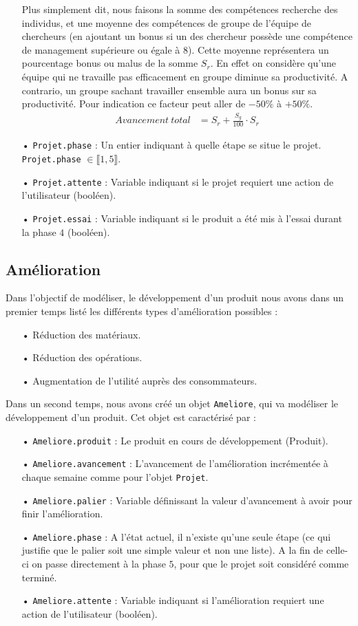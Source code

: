 \begin{enumerate}
	Plus simplement dit, nous faisons la somme des compétences recherche des individus, et une moyenne des compétences de groupe de l'équipe de chercheurs (en ajoutant un bonus si un des chercheur possède une compétence de management supérieure ou égale à $8$). Cette moyenne représentera un pourcentage bonus ou malus de la somme $S_{r}$. En effet on considère qu'une équipe qui ne travaille pas efficacement en groupe diminue sa productivité. A contrario, un groupe sachant travailler ensemble aura un bonus sur sa productivité. Pour indication ce facteur peut aller de $-50\%$ à $+50\%$. 
	\begin{align*}
	Avancement\ total &= S_{r}+\frac{S_{g}}{100}\cdot S_{r}
	\end{align*}
	
	\item[•] \texttt{Projet.phase} : Un entier indiquant à quelle étape se situe le projet. \texttt{Projet.phase} $\in \llbracket 1, 5 \rrbracket$.
	\item[•] \texttt{Projet.attente} : Variable indiquant si le projet requiert une action de l'utilisateur (booléen).
	\item[•] \texttt{Projet.essai} : Variable indiquant si le produit a été mis à l'essai durant la phase $4$ (booléen).
	\end{enumerate}
	
\subsection{Amélioration}
Dans l'objectif de modéliser, le développement d'un produit nous avons dans un premier temps listé les différents types d'amélioration possibles :
\begin{enumerate}
	\item[•] Réduction des matériaux.
	\item[•] Réduction des opérations.
	\item[•] Augmentation de l'utilité auprès des consommateurs.
\end{enumerate}
	\noindent
Dans un second temps, nous avons créé un objet \texttt{Ameliore}, qui va modéliser le développement d'un produit. Cet objet est caractérisé par : 
\begin{enumerate}
	\item[•] \texttt{Ameliore.produit} : Le produit en cours de développement (Produit).
	\item[•] \texttt{Ameliore.avancement} : L'avancement de l'amélioration incrémentée à chaque semaine comme pour l'objet \texttt{Projet}.
	\item[•] \texttt{Ameliore.palier} : Variable définissant la valeur d'avancement à avoir pour finir l'amélioration. 
	\item[•] \texttt{Ameliore.phase} : A l'état actuel, il n'existe qu'une seule étape (ce qui justifie que le palier soit une simple valeur et non une liste). A la fin de celle-ci on passe directement à la phase $5$, pour que le projet soit considéré comme terminé.
	\item[•] \texttt{Ameliore.attente} : Variable indiquant si l'amélioration requiert une action de l'utilisateur (booléen). 
\end{enumerate}
	
